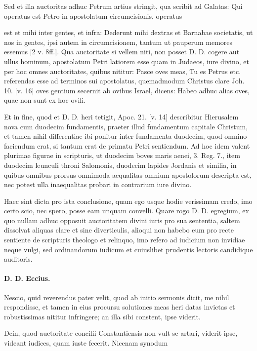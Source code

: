 Sed et illa auctoritas adhuc Petrum artius stringit, qua scribit ad Galatas: Qui operatus est Petro in apostolatum circumcisionis, operatus

est et mihi inter gentes, et infra: Dederunt mihi dextras et Barnabae societatis, ut nos in gentes, ipsi autem in circumcisionem, tantum ut pauperum memores essemus [2 v. 8ff.]. Qua auctoritate si vellem niti, non posset D. D. cogere aut ullus hominum, apostolatum Petri latiorem esse quam in Judaeos, iure divino, et per hoc omnes auctoritates, quibus nititur: Pasce oves meas, Tu es Petrus etc. referendas esse ad terminos sui apostolatus, quemadmodum Christus clare Joh. 10. [v. 16] oves gentium secernit ab ovibus Israel, dicens: Habeo adhuc alias oves, quae non sunt ex hoc ovili.

Et in fine, quod et D. D. heri tetigit, Apoc. 21. [v. 14] describitur Hierusalem nova cum duodecim fundamentis, praeter illud fundamentum capitale Christum, et tamen nihil differentiae ibi ponitur inter fundamenta duodecim, quod omnino faciendum erat, si tantum erat de primatu Petri sentiendum. Ad hoc idem valent plurimae figurae in scripturis, ut duodecim boves maris aenei, 3. Reg. 7., item duodecim leunculi throni Salomonis, duodecim lapides Jordanis et similia, in quibus omnibus prorsus omnimoda aequalitas omnium \marginpar{\small[315]} apostolorum descripta est, nec potest ulla inaequalitas probari in contrarium iure divino.

Haec sint dicta pro ista conclusione, quam ego usque hodie verissimam credo, imo certo scio, nec spero, posse eam unquam convelli. Quare rogo D. D. egregium, ex quo nullam adhuc opposuit auctoritatem divini iuris pro sua sententia, saltem dissolvat aliquas clare et sine diverticulis, alioqui non habebo eum pro recte sentiente de scripturis theologo et relinquo, imo refero ad iudicium non invidiae neque vulgi, sed ordinandorum iudicum et cuiuslibet prudentis lectoris candidique auditoris.

\paragraph*{D. D. Eccius.}

Nescio, quid reverendus pater velit, quod ab initio sermonis dicit, me nihil respondisse, et tamen in eius procursu solutiones meas heri datas invictas et robustissimas nititur infringere; an illa sibi constent, ipse viderit.

Dein, quod auctoritate concilii Constantiensis non vult se artari, viderit ipse, videant iudices, quam iuste fecerit. Nicenam synodum

